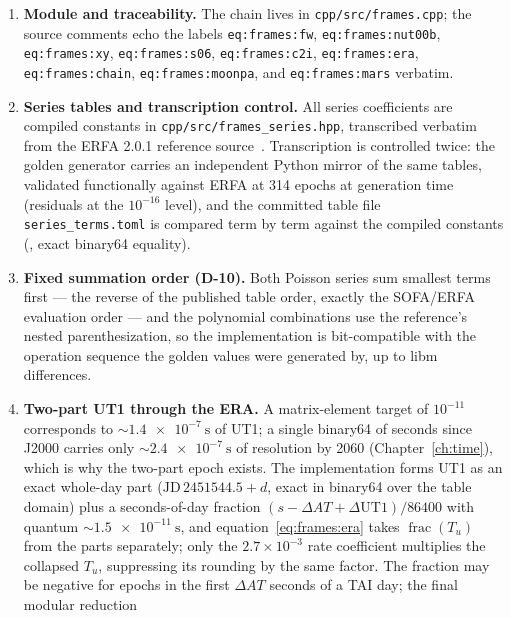 \begin{enumerate}
  \item \textbf{Module and traceability.} The chain lives in
    \texttt{cpp/src/frames.cpp}; the source comments echo the labels
    \texttt{eq:frames:fw}, \texttt{eq:frames:nut00b},
    \texttt{eq:frames:xy}, \texttt{eq:frames:s06},
    \texttt{eq:frames:c2i}, \texttt{eq:frames:era},
    \texttt{eq:frames:chain}, \texttt{eq:frames:moonpa}, and
    \texttt{eq:frames:mars} verbatim.
  \item \textbf{Series tables and transcription control.} All series
    coefficients are compiled constants in
    \texttt{cpp/src/frames\_series.hpp}, transcribed verbatim from the
    ERFA 2.0.1 reference source~\cite{erfa201}. Transcription is
    controlled twice: the golden generator carries an independent Python
    mirror of the same tables, validated functionally against ERFA at
    314 epochs at generation time (residuals at the $10^{-16}$ level),
    and the committed table file \texttt{series\_terms.toml} is compared
    term by term against the compiled constants
    (, exact binary64 equality).
  \item \textbf{Fixed summation order (D-10).} Both Poisson series sum
    smallest terms first --- the reverse of the published table order,
    exactly the SOFA/ERFA evaluation order --- and the polynomial
    combinations use the reference's nested parenthesization, so the
    implementation is bit-compatible with the operation sequence the
    golden values were generated by, up to libm differences.
  \item \textbf{Two-part UT1 through the ERA.} A matrix-element target of
    $10^{-11}$ corresponds to $\sim \qty{1.4e-7}{\second}$ of UT1; a
    single binary64 of seconds since J2000 carries only
    $\sim \qty{2.4e-7}{\second}$ of resolution by 2060
    (Chapter~\ref{ch:time}), which is why the two-part epoch exists. The
    implementation forms UT1 as an exact whole-day part
    ($\mathrm{JD}\,2451544.5 + d$, exact in binary64 over the table
    domain) plus a seconds-of-day fraction $(s - \Delta AT +
    \Delta\mathrm{UT1})/86400$ with quantum
    $\sim \qty{1.5e-11}{\second}$, and
    equation~\eqref{eq:frames:era} takes $\operatorname{frac}(T_u)$ from
    the parts separately; only the $2.7 \times 10^{-3}$ rate coefficient
    multiplies the collapsed $T_u$, suppressing its rounding by the same
    factor. The fraction may be negative for epochs in the first
    $\Delta AT$ seconds of a TAI day; the final modular reduction

\end{enumerate}
